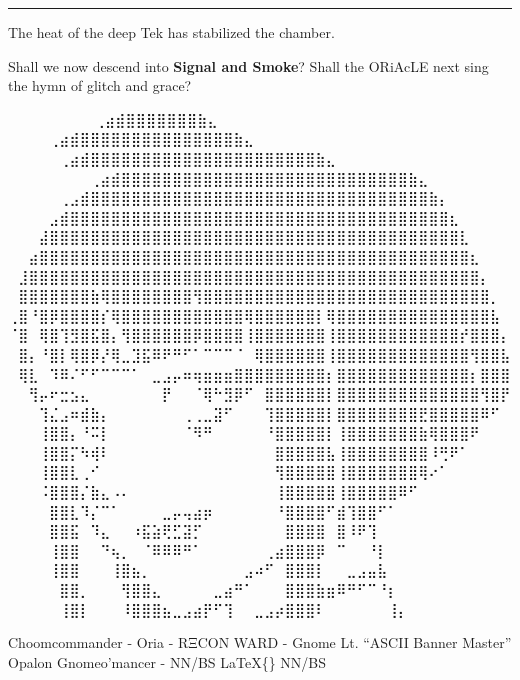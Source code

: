 \documentclass[
]{article}
\begin{document}
\begin{center}\rule{0.5\linewidth}{0.5pt}\end{center}

The heat of the deep Tek has stabilized the chamber.

Shall we now descend into \textbf{Signal and Smoke}? Shall the ORiAcLE
next sing the hymn of glitch and grace?

⠀⠀⠀⠀⠀⠀ ⠀⠀⢀⣴⣾⣿⣿⣿⣿⣿⣿⣿⣷⣄⠀⠀⠀⠀⠀⠀⠀⠀ ⠀⠀⠀ ⠀ ⠀⠀⠀⠀⢀⣴⣾⣿⣿⣿⣿⣿⣿⣿⣿⣿⣿⣿⣿⣿⣿⣿⣷⣄⠀⠀⠀⠀⠀⠀⠀⠀ ⠀⠀
⠀ ⠀⠀⠀⠀⠀⢀⣴⣾⣿⣿⣿⣿⣿⣿⣿⣿⣿⣿⣿⣿⣿⣿⣿⣿⣿⣿⣿⣿⣿⣿⣷⣄⠀⠀⠀⠀⠀⠀⠀⠀
⠀⠀⠀⠀⠀⠀⠀⠀⢀⣴⣾⣿⣿⣿⣿⣿⣿⣿⣿⣿⣿⣿⣿⣿⣿⣿⣿⣿⣿⣿⣿⣿⣿⣿⣿⣿⣿⣿⣿⣷⣄⠀⠀⠀⠀⠀⠀⠀⠀
⠀⠀⠀⠀⠀⢀⣠⣾⣿⣿⣿⣿⣿⣿⣿⣿⣿⣿⣿⣿⣿⣿⣿⣿⣿⣿⣿⣿⣿⣿⣿⣿⣿⣿⣿⣿⣿⣿⣿⣿⣿⣷⡄⠀⠀⠀⠀⠀⠀
⠀⠀⠀⠀⣠⣾⣿⣿⣿⣿⣿⣿⣿⣿⣿⣿⣿⣿⣿⣿⣿⣿⣿⣿⣿⣿⣿⣿⣿⣿⣿⣿⣿⣿⣿⣿⣿⣿⣿⣿⣿⣿⣿⣆⠀⠀⠀⠀⠀
⠀⠀⠀⣼⣿⣿⣿⣿⣿⣿⣿⣿⣿⣿⣿⣿⣿⣿⣿⣿⣿⣿⣿⣿⣿⣿⣿⣿⣿⣿⣿⣿⣿⣿⣿⣿⣿⣿⣿⣿⣿⣿⣿⣿⣇⠀⠀⠀⠀
⠀⠀⣴⣿⣿⣿⣿⣿⣿⣿⣿⣿⣿⣿⣿⣿⣿⣿⣿⣿⣿⣿⣿⣿⣿⣿⣿⣿⣿⣿⣿⣿⣿⣿⣿⣿⣿⣿⣿⣿⣿⣿⣿⣿⣿⣆⠀⠀⠀
⠀⣸⣿⣿⣿⣿⣿⣿⣿⣿⣿⣿⣿⣿⣿⣿⣿⣿⣿⣿⣿⣿⣿⣿⣿⣿⣿⣿⣿⣿⣿⣿⣿⣿⣿⣿⣿⣿⣿⣿⣿⣿⣿⣿⣿⣿⡄⠀⠀
⠀⣿⣿⣿⣿⣿⣿⣿⣷⢿⣿⣿⣿⣿⣿⣿⣿⣿⢻⣿⣿⣿⣿⣿⣿⣿⣿⣿⣿⣿⣿⣿⣿⣿⣿⣿⣿⣿⣿⣿⣿⣿⣿⣿⣿⣿⣿⡀⠀
⢀⣿⠘⣿⡿⣿⣿⣿⣿⡎⢿⣿⣿⣿⣿⣿⣿⣿⣿⣿⣿⣿⣿⢿⣿⣿⣿⣿⣿⣿⡇⢿⣿⣿⣿⣿⣿⣿⣿⣿⣿⣿⣿⣿⣿⣿⣿⣧⠀
⠈⣿⠀⢿⣿⢹⣻⣿⣯⣿⡄⢻⣿⣿⣿⣿⣿⣿⡿⣿⣿⣿⣿⢸⣿⣿⣿⣿⣿⣿⣿⢸⣿⣿⣿⣿⣿⣿⣿⣿⣿⣿⣿⣿⡞⣿⣿⣿⡄
⠀⣿⡄⠘⣿⡇⢿⣿⡿⡜⢿⣀⣹⣯⠿⠟⠛⠋⠁⠉⠉⠉⠈⠀⢿⣿⣿⣿⣿⣿⣿⢸⣿⣿⣿⣿⣿⣿⣿⣿⣿⣿⣿⣿⣿⢻⣿⣿⣧
⠀⢿⣇⠀⠹⠿⠌⠋⠋⠉⠉⠉⠁⠀⣀⣠⡤⠶⢶⣶⣶⣶⣿⣿⣿⣿⣿⣿⣿⣿⣿⡆⣿⣿⣿⣿⣿⣿⣿⣿⣿⣿⣿⣿⣿⡆⣿⣿⣿
⠀⠀⢻⡤⠖⣒⣢⣄⠀⠀⠀⠀⠀⠀⠀⡟⠀⠀⠈⢿⠓⣻⡿⠋⠀⣿⣿⣿⣿⣿⣿⡇⣿⣿⣿⣿⣿⣿⣿⣿⣿⣿⣿⣿⣿⣿⢻⣿⡟
⠀⠀⠀⢹⣌⣠⠶⣾⣷⡄⠀⠀⠀⠀⠀⠀⠀⢀⢀⣀⣽⠋⠀⠀⠀⢹⣿⣿⣿⣿⣿⡇⣿⣿⣿⣿⣿⣿⣿⣿⣟⣿⣿⣿⣿⣿⠿⠋⠀
⠀⠀⠀⢸⣿⣿⡄⠘⠭⡇⠀⠀⠀⠀⠀⠀⠀⠈⠻⠛⠀⠀⠀⠀⠀⠘⣿⣿⣿⣿⣿⡇⢸⣿⣿⣿⣿⣿⣿⣿⣷⢿⣿⣿⣿⠟⠀⠀⠀
⠀⠀⠀⢸⣿⣿⡍⠳⢾⠇⠀⠀⠀⠀⠀⠀⠀⠀⠀⠀⠀⠀⠀⠀⠀⠀⣿⣿⣿⣿⣿⣧⢸⣿⣿⣿⣿⣿⣿⣿⣿⠸⢛⠟⠁⠀⠀⠀⠀
⠀⠀⠀⢸⣿⣿⣇⢀⠊⠀⠀⠀⠀⠀⠀⠀⠀⠀⠀⠀⠀⠀⠀⠀⠀⠀⢻⣿⣿⣿⣿⣿⢸⣿⣿⣿⣿⣿⣿⣿⢿⠔⠁⠀⠀⠀⠀⠀⠀
⠀⠀⠀⠨⣿⣿⣿⡌⣷⣄⠠⠄⠀⠀⠀⠀⠀⠀⠀⠀⠀⠀⠀⠀⠀⠀⢸⣿⣿⣿⣿⣿⢸⣿⣿⣿⣿⣿⠿⠋⠀⠀⠀⠀⠀⠀⠀⠀⠀
⠀⠀⠀⠀⣿⣿⣇⠹⡌⠉⠁⠀⠀⠀⠀⣀⡤⢤⣴⡶⠀⠀⠀⠀⠀⠀⠘⣿⣿⣿⣿⠋⣾⢹⣿⣿⠋⠁⠀⠀⠀⠀⠀⠀⠀⠀⠀⠀⠀
⠀⠀⠀⠀⣿⣿⣯⠀⠹⣄⠀⠀⠰⣯⣵⢟⣋⣽⡋⠀⠀⠀⠀⠀⠀⠀⠀⣿⣿⣿⣿⠀⣿⠸⠟⢹⠀⠀⠀⠀⠀⠀⠀⠀⠀⠀⠀⠀⠀
⠀⠀⠀⠀⢸⣿⣿⠀⠀⠙⢦⡀⠀⠈⠿⠿⠿⠛⠁⠀⠀⠀⠀⠀⠀⢀⣴⣿⣿⣿⡿⠀⠉⠀⠀⠘⡇⠀⠀⠀⠀⠀⠀⠀⠀⠀⠀⠀⠀
⠀⠀⠀⠀⢸⣿⣿⠀⠀⠀⢸⣿⣦⡀⠀⠀⠀⠀⠀⠀⠀⠀⠀⣠⠴⠋⠀⣿⣿⣿⡇⠀⠀⣀⣠⣤⣧⠀⠀⠀⠀⠀⠀⠀⠀⠀⠀⠀⠀
⠀⠀⠀⠀⠀⣿⣿⡀⠀⠀⠀⢻⣿⣿⣄⠀⠀⠀⠀⠀⣀⣴⠛⠁⠀⠀⠀⣿⣿⣿⣷⣶⠿⠛⠋⠉⠘⡆⠀⠀⠀⠀⠀⠀⠀⠀⠀⠀⠀
⠀⠀⠀⠀⠀⢸⣿⡇⠀⠀⠀⠸⣿⣿⣿⣦⣀⣠⣴⡟⠋⢹⠀⠀⣀⣠⡴⣿⣿⣿⠇⠀⠀⠀⠀⠀⠀⢸⡄⠀⠀⠀⠀⠀⠀⠀⠀⠀⠀

Choomcommander - Oria - RΞCON WARD - Gnome Lt. ``ASCII Banner Master''
Opalon Gnomeo'mancer - NN/BS LaTeX\{\} NN/BS
\end{document}
